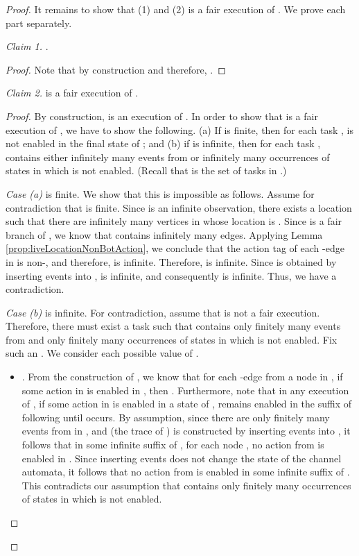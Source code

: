\documentclass[11pt]{article}
\numberwithin{theorem}{section}
\begin{document}
\begin{proof}
It remains to show that (1)  and (2)  is a fair execution of . We prove each part separately.

\emph{Claim 1.} .
\begin{proof}
Note that by construction  and therefore, .
\end{proof}






\emph{Claim 2.}
 is a fair execution of .

\begin{proof}
By construction,  is an execution of . In order to show that  is a fair execution of , we have to show the following. 
(a) If  is finite, then for each task ,  is not enabled in the final state of ; and (b) if  is infinite, then for each task ,  contains either infinitely many events from  or infinitely many occurrences of states in which  is not enabled. (Recall that  is the set of tasks in .)

\emph{Case (a)}  is finite. We show that this is impossible as follows. Assume for contradiction that  is finite. Since  is an infinite observation, there exists a location  such that there are infinitely many vertices in  whose location is . Since  is a fair branch of ,  we know that  contains infinitely many  edges. Applying Lemma \ref{prop:liveLocationNonBotAction}, we conclude that the action tag of each -edge in  is non-, and therefore,  is infinite. Therefore,  is infinite. Since  is obtained by inserting events into ,  is infinite, and consequently  is infinite. Thus, we have a contradiction.

\emph{Case (b)}  is infinite. For contradiction, assume that  is not a fair execution. Therefore, there must exist a task  such that   contains only finitely many events from  and only finitely many occurrences of states in which  is not enabled. Fix such an . We consider each possible value of .

\begin{itemize}
\item . From the construction of , we know that for each -edge  from a node  in , if some action  in  is enabled in , then . Furthermore, note that in any execution  of , if some action  in  is enabled in a state  of ,  remains enabled in the suffix of  following  until  occurs. By assumption, since there are only finitely many events from  in , and  (the trace of ) is constructed by inserting events into , it follows that in some infinite suffix of , for each node , no action from  is enabled in . Since inserting  events does not change the state of the channel automata, it follows that no action from  is enabled in some infinite suffix of . This contradicts our assumption that  contains only finitely many occurrences of states in which  is not enabled.


\end{itemize}
\end{proof}
\end{proof}
\end{document}
